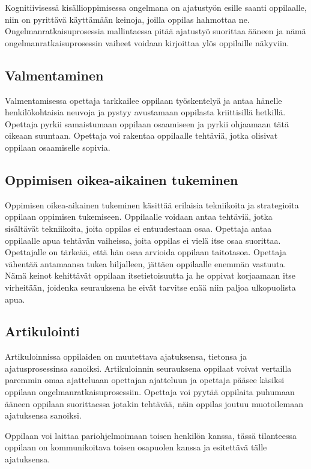 \documentclass[finnish]{tktltiki2}
\theoremstyle{definition}
\theoremstyle{remark}
\begin{document}
Kognitiivisessä kisällioppimisessa ongelmana on ajatustyön esille saanti oppilaalle, niin on pyrittävä käyttämään keinoja, joilla oppilas hahmottaa ne.  Ongelmanratkaisuprosessia mallintaessa pitää ajatustyö suorittaa ääneen ja nämä ongelmanratkaisuprosessin vaiheet voidaan kirjoittaa ylös oppilaille näkyviin.

\subsection{Valmentaminen}
Valmentamisessa opettaja tarkkailee oppilaan työskentelyä ja antaa hänelle henkilökohtaisia neuvoja ja pystyy avustamaan oppilasta kriittisillä hetkillä. Opettaja pyrkii samaistumaan oppilaan osaamiseen ja pyrkii ohjaamaan tätä oikeaan suuntaan. Opettaja voi rakentaa oppilaalle tehtäviä, jotka olisivat oppilaan osaamiselle sopivia.

\subsection{Oppimisen oikea-aikainen tukeminen}
Oppimisen oikea-aikainen tukeminen käsittää erilaisia tekniikoita ja strategioita oppilaan oppimisen tukemiseen. Oppilaalle voidaan antaa tehtäviä, jotka sisältävät tekniikoita, joita oppilas ei entuudestaan osaa. Opettaja antaa oppilaalle apua tehtävän vaiheissa, joita oppilas ei vielä itse osaa suorittaa. Opettajalle on tärkeää, että hän osaa arvioida oppilaan taitotasoa. Opettaja vähentää antamaansa tukea hiljalleen, jättäen oppilaalle enemmän vastuuta. Nämä keinot kehittävät oppilaan itsetietoisuutta ja he oppivat korjaamaan itse virheitään, joidenka seurauksena he eivät tarvitse enää niin paljoa ulkopuolista apua.

\subsection{Artikulointi}
Artikuloinnissa oppilaiden on muutettava ajatuksensa, tietonsa ja ajatusprosessinsa sanoiksi. Artikuloinnin seurauksena oppilaat voivat vertailla paremmin omaa ajatteluaan opettajan ajatteluun ja opettaja pääsee käsiksi oppilaan ongelmanratkaisuprosessiin. Opettaja voi pyytää oppilaita puhumaan ääneen oppilaan suorittaessa jotakin tehtävää, näin oppilas joutuu muotoilemaan ajatuksensa sanoiksi. 

Oppilaan voi laittaa pariohjelmoimaan toisen henkilön kanssa, tässä tilanteessa oppilaan on kommunikoitava toisen osapuolen kanssa ja esitettävä tälle ajatuksensa.
\end{document}
